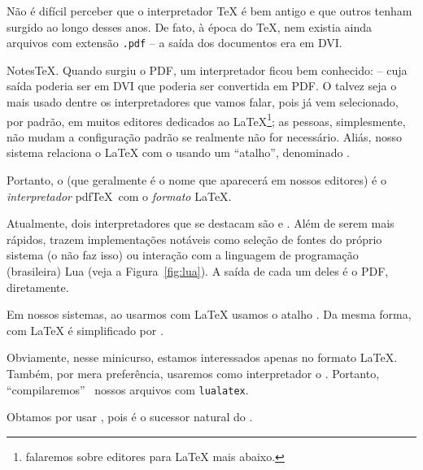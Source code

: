 Não é difícil perceber que o interpretador \TeX{} é bem antigo e que outros tenham
surgido ao longo desses anos.
De fato, à época do \TeX, nem existia ainda arquivos com extensão  \texttt{.pdf} 
-- a saída dos documentos era em DVI.
NotesTeX.
Quando surgiu o PDF, um interpretador ficou bem conhecido:  -- cuja 
saída poderia ser em DVI que poderia ser convertida em PDF. 
O  talvez seja o mais usado dentre os interpretadores que vamos 
falar, pois já vem selecionado, por padrão, em muitos editores dedicados ao 
\LaTeX \footnote{%
  falaremos sobre editores para \LaTeX{} mais abaixo.}; 
as pessoas, simplesmente, não mudam a configuração padrão se realmente não 
for necessário.
Aliás, nosso sistema relaciona o \LaTeX{} com o  usando um 
``atalho'', denominado .

Portanto, o  (que geralmente é o nome que aparecerá em nossos 
editores) é o \textit{interpretador} pdf\TeX\ com o \textit{formato} \LaTeX. 

Atualmente, dois interpretadores que se destacam são  e .
Além de serem mais rápidos, trazem implementações notáveis como seleção de fontes 
do próprio sistema (o  não faz isso) ou interação com a linguagem 
de programação (brasileira) Lua (veja a Figura~\ref{fig:lua}). 
A saída de cada um deles é o PDF, diretamente.

Em nossos sistemas, ao usarmos  com \LaTeX{} usamos o atalho 
.
Da mesma forma,  com \LaTeX{} é simplificado por .

Obviamente, nesse minicurso, estamos interessados apenas no formato \LaTeX.
Também, por mera preferência, usaremos como interpretador o .
Portanto, ``compilaremos'' \, nossos arquivos com \texttt{lualatex}.

Obtamos por usar \lualatex, pois é o sucessor natural do \pdflatex. 

